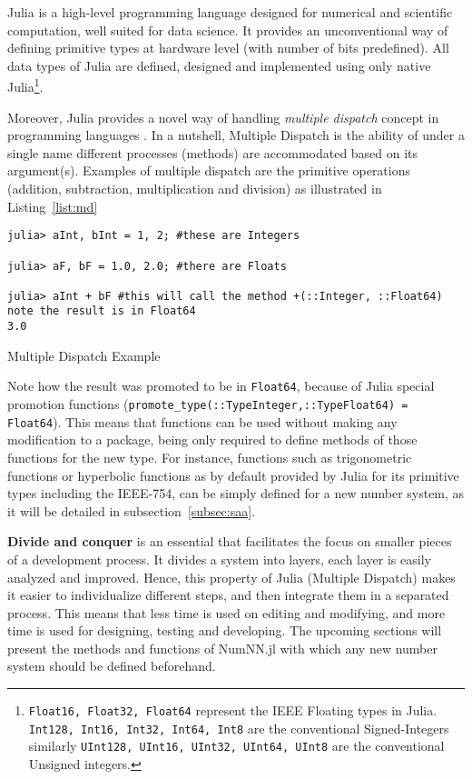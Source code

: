 Julia \cite{Julia,Bezanson2017} is a high-level programming language designed for numerical and scientific computation, well suited for data science. It provides an unconventional way of defining primitive types at hardware level (with number of bits predefined). All data types of Julia are defined, designed and implemented using only native Julia\footnote{\texttt{Float16, Float32, Float64} represent the IEEE Floating types in Julia. \texttt{Int128, Int16, Int32, Int64, Int8} are the conventional Signed-Integers similarly \texttt{UInt128, UInt16, UInt32, UInt64, UInt8} are the conventional Unsigned integers.}.

Moreover, Julia provides a novel way of handling \emph{multiple dispatch} \cite{WikiMultipleDispatch} concept in programming languages \cite{JuliaMehtods}. In a nutshell, Multiple Dispatch is the ability of under a single name different processes (methods) are accommodated based on its argument(s). Examples of multiple dispatch are the primitive operations (addition, subtraction, multiplication and division) as illustrated in Listing~\ref{list:md}

\begin{listing}[H]
\begin{verbatim}
julia> aInt, bInt = 1, 2; #these are Integers

julia> aF, bF = 1.0, 2.0; #there are Floats

julia> aInt + bF #this will call the method +(::Integer, ::Float64) note the result is in Float64
3.0
\end{verbatim}
\caption{Multiple Dispatch Example}\label{list:md}
\end{listing}

Note how the result was promoted to be in \texttt{Float64}, because of Julia special promotion functions (\texttt{promote_type(::Type{Integer},::Type{Float64}) = Float64}). This means that functions can be used without making any modification to a package, being only required to define methods of those functions for the new type. For instance, functions such as trigonometric functions or hyperbolic functions as by default provided by Julia for its primitive types including the IEEE-754, can be simply defined for a new number system, as it will be detailed in subsection~\ref{subsec:saa}.

\textbf{Divide and conquer} is an essential that facilitates the focus on smaller pieces of a development process. It divides a system into layers, each layer is easily analyzed and improved. Hence, this property of Julia (Multiple Dispatch) makes it easier to individualize different steps, and then integrate them in a separated process. This means that less time is used on editing and modifying, and more time is used for designing, testing and developing. The upcoming sections will present the methods and functions of NumNN.jl with which any new number system should be defined beforehand.

